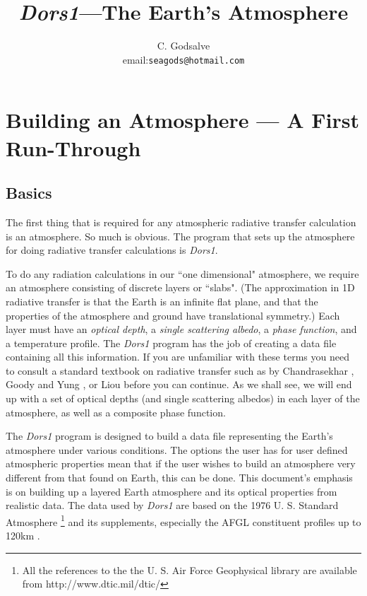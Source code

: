 \documentclass[12pt]{article}
\begin{document}


\thispagestyle{empty}

\title{{\it Dors1}---The Earth's Atmosphere}

\author{C. Godsalve \\
email:{\tt seagods@hotmail.com} }

\maketitle

\tableofcontents

\section{Building an Atmosphere --- A First Run-Through}

\subsection{Basics}

The first thing that is required for any atmospheric radiative transfer calculation is
an atmosphere. So much is obvious. The program that sets up
the atmosphere for doing radiative transfer calculations is {\it Dors1}. 

To do any radiation calculations in our ``one dimensional" atmosphere, we 
require an atmosphere consisting of discrete
layers or ``slabs". (The approximation in 1D radiative transfer is that the Earth is an infinite  flat plane,
 and that the properties of the atmosphere and ground have translational symmetry.)
Each layer must have an {\it optical depth}, a {\it single scattering albedo}, 
a {\it phase function}, and a temperature profile. The {\it Dors1} program has the job of creating a
data file containing all this information. If you are unfamiliar with these terms you need
to consult a standard textbook on radiative transfer such as by Chandrasekhar \cite{Chandrasekhar:Mybib},
 Goody and Yung \cite{GoodyYung:Mybib}, or Liou \cite{Liou:Mybib} before you can continue.
As we shall see, we will end up with a set of optical depths (and single scattering albedos) in each layer of the atmosphere,
 as well as a composite phase function.

The  {\it Dors1} program is designed to build a data file representing the Earth's atmosphere under various conditions.
The options the user has for user defined atmospheric properties mean that if the user wishes
to build an atmosphere very different from that found on Earth, this can be done.
This document's emphasis is on 
building up a layered Earth atmosphere and its optical properties from realistic data. 
The data used by {\it Dors1} are based on
the 1976 U. S. Standard Atmosphere \footnote[1]{All the references to the the U. S. Air Force
Geophysical library are available from http://www.dtic.mil/dtic/}  \cite{USStandard:Mybib} and its supplements, especially the AFGL constituent
profiles up to 120km \cite{ConstProfs:Mybib}.
\end{document}
